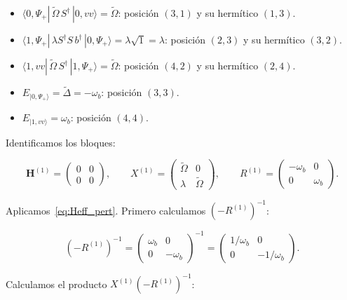\documentclass[12pt]{article}
\begin{document}
	\begin{itemize}
		\item $\langle 0,\Psi_+|\,\widetilde{\Omega}\,S^\dagger\,|0,vv\rangle
		= \widetilde{\Omega}$: posici\'on $(3,1)$ y su herm\'itico $(1,3)$.
		\item $\langle 1,\Psi_+|\,\lambda S^\dagger S\,b^\dagger\,|0,\Psi_+\rangle
		= \lambda\sqrt{1} = \lambda$: posici\'on $(2,3)$ y su herm\'itico $(3,2)$.
		\item $\langle 1,vv|\,\widetilde{\Omega}\,S^\dagger\,|1,\Psi_+\rangle
		= \widetilde{\Omega}$: posici\'on $(4,2)$ y su herm\'itico $(2,4)$.
		\item $E_{|0,\Psi_+\rangle} = \widetilde{\Delta} = -\omega_b$:
		posici\'on $(3,3)$.
		\item $E_{|1,vv\rangle} = \omega_b$: posici\'on $(4,4)$.
	\end{itemize}
	
	\noindent
	Identificamos los bloques:
	
	\begin{equation}
		\mathbf{H}^{(1)} = \begin{pmatrix} 0 & 0 \\ 0 & 0 \end{pmatrix}, \qquad
		X^{(1)} = \begin{pmatrix} \widetilde{\Omega} & 0 \\ \lambda & \widetilde{\Omega}
		\end{pmatrix}, \qquad
		R^{(1)} = \begin{pmatrix} -\omega_b & 0 \\ 0 & \omega_b \end{pmatrix}.
		\label{eq:bloques_n1}
	\end{equation}
	
	\noindent
	Aplicamos~\eqref{eq:Heff_pert}. Primero calculamos
	$(-R^{(1)})^{-1}$:
	
	\begin{equation}
		\left(-R^{(1)}\right)^{-1} =
		\begin{pmatrix} \omega_b & 0 \\ 0 & -\omega_b \end{pmatrix}^{-1}
		= \begin{pmatrix} 1/\omega_b & 0 \\ 0 & -1/\omega_b \end{pmatrix}.
	\end{equation}
	
	\noindent
	Calculamos el producto $X^{(1)}(-R^{(1)})^{-1}$:
	
\end{document}
